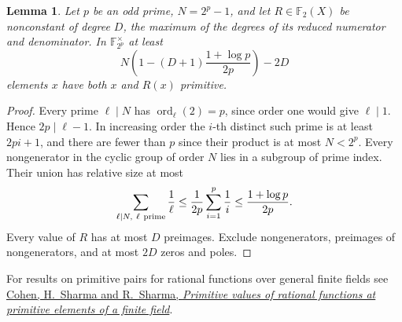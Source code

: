 \documentclass[11pt]{article}
\newtheorem{lemma}[theorem]{Lemma}
\newcommand{\F}{\mathbb F_2}
\newcommand{\ord}{\operatorname{ord}}
\begin{document}
\begin{lemma}\label{lem:prime-field-generators}
Let \(p\) be an odd prime, \(N=2^p-1\), and let \(R\in\F(X)\) be
nonconstant of degree \(D\), the maximum of the degrees of its reduced
numerator and denominator. In \(\mathbb F_{2^p}^{\times}\) at least
\[
 N\left(1-(D+1)\frac{1+\log p}{2p}\right)-2D
\]
elements \(x\) have both \(x\) and \(R(x)\) primitive.
\end{lemma}
\begin{proof}
Every prime \(\ell\mid N\) has \(\ord_\ell(2)=p\), since order one
would give \(\ell\mid1\). Hence \(2p\mid\ell-1\). In increasing
order the \(i\)-th distinct such prime is at least \(2pi+1\), and
there are fewer than \(p\) since their product is at most \(N<2^p\).
Every nongenerator in the cyclic group of order \(N\) lies in a
subgroup of prime index. Their union has relative size at most
\[
 \sum_{\ell\mid N,\ \ell\ {\rm prime}}\frac1\ell
    \le \frac1{2p}\sum_{i=1}^p\frac1i\le\frac{1+\log p}{2p}.
\]
Every value of \(R\) has at most \(D\) preimages. Exclude nongenerators,
preimages of nongenerators, and at most \(2D\) zeros and poles.
\end{proof}
For results on primitive pairs for rational functions over general
finite fields see
\href{https://arxiv.org/abs/1909.13074}{Cohen, H.~Sharma and R.~Sharma,
\emph{Primitive values of rational functions at primitive elements of a finite field}}.
\end{document}
